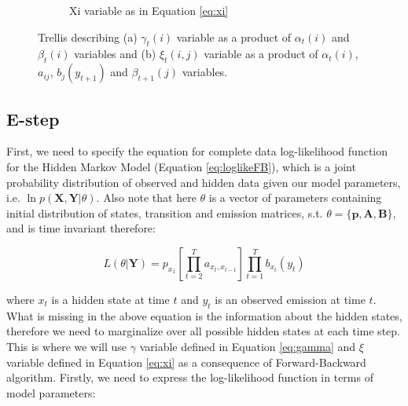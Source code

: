 \begin{figure}[htbp]
\begin{subfigure}{.5\textwidth}
    \caption{Xi variable as in Equation \ref{eq:xi}}
    \end{subfigure}
\caption[Visualization of posterior variables resulting from E-step]{Trellis describing (a) $\gamma_t(i)$ variable as a product of $\alpha_t(i)$ and $\beta_t(i)$ variables and 
                            (b) $\xi_t(i,j)$ variable as a product of $\alpha_t(i)$, $a_{ij}$, $b_j(y_{t+1})$ and $\beta_{t+1}(j)$ variables.}
\end{figure}

\subsection*{E-step}

First, we need to specify the equation for complete data log-likelihood function for the Hidden Markov Model (Equation \ref{eq:loglikeFB}), which is a joint probability distribution of observed and 
hidden data given our model parameters, i.e. $\ln p(\textbf{X},\textbf{Y}|\theta)$. Also note that here $\theta$ is a vector of parameters containing initial 
distribution of states, transition and emission matrices, s.t. $\theta = \{\textbf{p}, \textbf{A}, \textbf{B}\}$, and is time invariant therefore:

\begin{equation}
    L(\theta|\textbf{Y}) = p_{x_1} \left[ \prod_{t=2}^{T} a_{x_t,x_{t-1}} \right] \prod_{t=1}^{T} b_{x_t}(y_t)
\end{equation}

where $x_t$ is a hidden state at time $t$ and $y_t$ is an observed emission at time $t$. What is missing in the above equation is the information about the
hidden states, therefore we need to marginalize over all possible hidden states at each time step.
This is where we will use $\gamma$ variable defined in Equation \ref{eq:gamma} and $\xi$ variable defined in Equation \ref{eq:xi} as a consequence of 
Forward-Backward algorithm. Firstly, we need to express the log-likelihood function in terms of model parameters:

